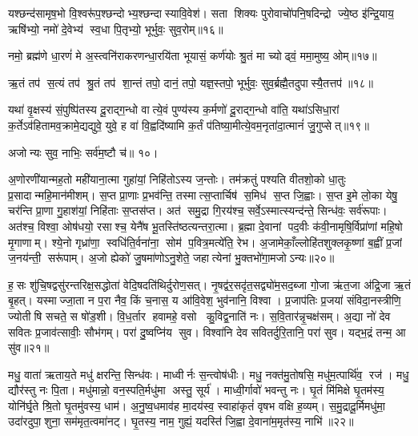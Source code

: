 यश्छन्द॑सामृष॒भो वि॒श्वरू॑प॒श्छन्दोभ्य॒श्छन्दास्यावि॒वेश॑। सता शिक्यः पुरोवाचो॑पनि॒षदिन्द्रो ज्ये॒ष्ठ इ॑न्द्रि॒याय॒ ऋषि॑भ्यो॒ नमो॑ दे॒वेभ्य॑ स्व॒धा पि॒तृभ्यो॒ भूर्भुवः॒ सुव॒रोम्॥१६॥
\anuvakamend


नमो॒ ब्रह्म॑णे धा॒रणं॑ मे अ॒स्त्वनि॑राकरणन्धा॒रयि॑ता भूयासं॒ कर्ण॑योः  श्रु॒तं मा च्योढ्वं॒ ममा॒मुष्य॒ ओम्॥१७॥
\anuvakamend


ऋ॒तं तप॑ स॒त्यं तप॑ श्रु॒तं तप॑ शा॒न्तं तपो॒ दानं॒ तपो॒ यज्ञ॒स्तपो॒ भूर्भुवः॒ सुव॒र्ब्रह्मै॒तदुपास्यै॒तत्तप॑॥१८॥
\anuvakamend



यथा॑ वृ॒क्षस्य॑ सं॒पुष्पि॑तस्य दू॒राद्ग॒न्धो वात्ये॒वं पुण्य॑स्य क॒र्मणो॑ दू॒राद्ग॒न्धो वा॑ति॒ यथा॑ऽसिधा॒रां क॒र्तेऽव॑हितामव॒क्रामे॒द्यद्युवे॒ युवे॒ ह वा॑ वि॒ह्वदि॑ष्यामि क॒र्तं प॑तिष्या॒मीत्ये॒वम॒नृता॑दा॒त्मानं॑ जु॒गुप्सेत्॥१९॥

अजोन्यः सुव॒ नाभिः॒ सर्व॑म॒ष्टौ च॑॥ १०।
\anuvakamend


अ॒णोरणी॑यान्मह॒तो मही॑याना॒त्मा गुहा॑यां॒ निहि॑तोऽस्य ज॒न्तोः। तम॑क्रतुं पश्यति वीतशो॒को धा॒तुः प्र॒सादान्महि॒मान॑मीशम्। स॒प्त प्रा॒णाः प्र॒भव॑न्ति॒ तस्मात्स॒प्तार्चिष॑ स॒मिध॑ स॒प्त जि॒ह्वाः। स॒प्त इ॒मे लो॒का येषु॒ चर॑न्ति प्रा॒णा गु॒हाश॑यां॒ निहि॑ताः स॒प्तस॑प्त। अत॑ समु॒द्रा गि॒रय॑श्च॒ सर्वे॒ऽस्मात्स्यन्द॑न्ते॒ सिन्ध॑वः॒ सर्व॑रूपाः। अत॑श्च॒ विश्वा॒ ओष॑धयो॒ रसाश्च॒ येनै॑ष भू॒तस्ति॑ष्ठत्यन्तरा॒त्मा। ब्र॒ह्मा दे॒वानां पद॒वीः क॑वी॒नामृषि॒र्विप्रा॑णां महि॒षो मृ॒गाणाम्। श्ये॒नो गृध्रा॑णा॒ स्वधि॑ति॒र्वना॑ना॒ सोम॑ प॒वित्र॒मत्ये॑ति॒ रेभ\sn{}। अ॒जामेकाँ॒ल्लोहि॑तशुक्लकृ॒ष्णां ब॒ह्वीं प्र॒जां ज॒नय॑न्ती॒ सरू॑पाम्। अ॒जो ह्येको॑ जु॒षमा॑णोऽनु॒शेते॒ जहात्येनां भु॒क्तभो॑गा॒मजोऽन्यः॥२०॥

ह॒सः  शु॑चि॒षद्वसु॑रन्तरिक्ष॒सद्धोता॑ वेदि॒षदति॑थिर्दुरोण॒सत्। नृ॒षद्व॑र॒सदृ॑त॒सद्व्यो॑म॒सद॒ब्जा गो॒जा ऋ॑त॒जा अ॑द्रि॒जा ऋ॒तं बृ॒हत्। यस्माज्जा॒ता न प॒रा नैव॒ किं च॒नास॒ य आ॑वि॒वेश॒ भुव॑नानि॒ विश्वा। प्र॒जाप॑तिः प्र॒जया॑ संविदा॒नस्त्रीणि॒ ज्योतीषि सचते॒ स षो॑ड॒शी। वि॒ध॒र्तार हवामहे॒ वसो कु॒विद्व॒नाति॑ नः। स॒वि॒तार॑न्नृ॒चक्ष॑सम्। अ॒द्या नो॑ देव सवितः प्र॒जाव॑त्सावीः॒ सौभ॑गम्। परा॑ दु॒ष्वप्नि॑य सुव। विश्वा॑नि देव सवितर्दुरि॒तानि॒ परा॑ सुव। यद्भ॒द्रं तन्म॒ आ सु॑व॥२१॥

मधु॒ वाता॑ ऋताय॒ते मधु॑ क्षरन्ति॒ सिन्ध॑वः। माध्वीर्नः स॒न्त्वोष॑धीः। मधु॒ नक्त॑मु॒तोषसि॒ मधु॑म॒त्पार्थि॑व॒ रज॑। मधु॒ द्यौर॑स्तु नः पि॒ता। मधु॑मान्नो॒ वन॒स्पति॒र्मधु॑मा अस्तु॒ सूर्य॑। माध्वी॒र्गावो॑ भवन्तु नः। घृ॒तं मि॑मिक्षे घृ॒तम॑स्य॒ योनि॑र्घृ॒ते श्रि॒तो घृ॒तमु॑वस्य॒ धाम॑। अ॒नु॒ष्व॒धमाव॑ह मा॒दय॑स्व॒ स्वाहा॑कृतं॑ वृषभ वक्षि ह॒व्यम्। स॒मु॒द्रादू॒र्मिमधु॑मा॒ उदा॑रदुपा॒शुना॒ सम॑मृत॒त्वमा॑नट्। घृ॒तस्य॒ नाम॒ गुह्यं॒ यदस्ति॑ जि॒ह्वा दे॒वाना॑म॒मृत॑स्य॒ नाभि॑॥२२॥

